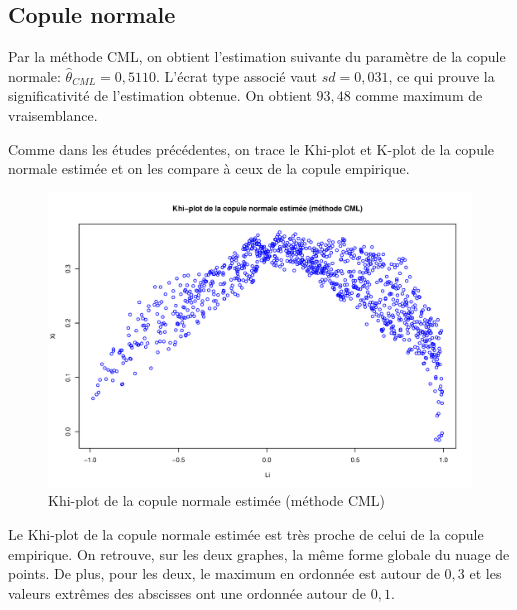 \subsection{Copule normale}

Par la méthode CML, on obtient l'estimation suivante du paramètre de la copule normale: $\widehat{\theta}_{CML}=0,5110$. L'écrat type associé vaut $sd = 0,031$, ce qui prouve la significativité de l'estimation obtenue. On obtient $93,48$ comme maximum de vraisemblance. 

Comme dans les études précédentes, on trace le Khi-plot et K-plot de la copule normale estimée et on les compare à ceux de la copule empirique.

\noindent%
\begin{figure}[H]
    \begin{center}
      \includegraphics[width=17 cm, angle=0]{./pictures/normalcmlkhiplot.png}
      \centering\caption{\label{2}Khi-plot de la copule normale estimée (méthode CML)}
    \end{center}
\end{figure}

Le Khi-plot de la copule normale estimée est très proche de celui de la copule empirique. On retrouve, sur les deux graphes, la même forme globale du nuage de points. De plus, pour les deux, le maximum en ordonnée est autour de $0,3$ et les valeurs extrêmes des abscisses ont une ordonnée autour de $0,1$. 

